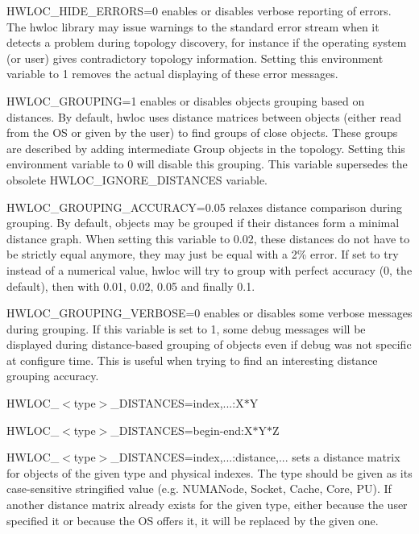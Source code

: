 \begin{DoxyDescription}
\item[HWLOC\_\-HIDE\_\-ERRORS=0 ]enables or disables verbose reporting of errors. The hwloc library may issue warnings to the standard error stream when it detects a problem during topology discovery, for instance if the operating system (or user) gives contradictory topology information. Setting this environment variable to 1 removes the actual displaying of these error messages. 


\item[HWLOC\_\-GROUPING=1 ]enables or disables objects grouping based on distances. By default, hwloc uses distance matrices between objects (either read from the OS or given by the user) to find groups of close objects. These groups are described by adding intermediate Group objects in the topology. Setting this environment variable to 0 will disable this grouping. This variable supersedes the obsolete HWLOC\_\-IGNORE\_\-DISTANCES variable. 


\item[HWLOC\_\-GROUPING\_\-ACCURACY=0.05 ]relaxes distance comparison during grouping. By default, objects may be grouped if their distances form a minimal distance graph. When setting this variable to 0.02, these distances do not have to be strictly equal anymore, they may just be equal with a 2\% error. If set to {\ttfamily try} instead of a numerical value, hwloc will try to group with perfect accuracy (0, the default), then with 0.01, 0.02, 0.05 and finally 0.1.


\item[HWLOC\_\-GROUPING\_\-VERBOSE=0 ]enables or disables some verbose messages during grouping. If this variable is set to 1, some debug messages will be displayed during distance-\/based grouping of objects even if debug was not specific at configure time. This is useful when trying to find an interesting distance grouping accuracy.


\item[HWLOC\_\-$<$type$>$\_\-DISTANCES=index,...:X$\ast$Y ]
\item[HWLOC\_\-$<$type$>$\_\-DISTANCES=begin-\/end:X$\ast$Y$\ast$Z ]
\item[HWLOC\_\-$<$type$>$\_\-DISTANCES=index,...:distance,... ]sets a distance matrix for objects of the given type and physical indexes. The type should be given as its case-\/sensitive stringified value (e.g. {\ttfamily NUMANode}, {\ttfamily Socket}, {\ttfamily Cache}, {\ttfamily Core}, {\ttfamily PU}). If another distance matrix already exists for the given type, either because the user specified it or because the OS offers it, it will be replaced by the given one.


\end{DoxyDescription}
